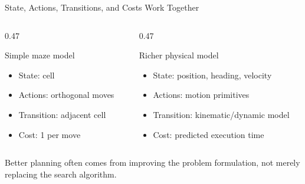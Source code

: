 \documentclass[aspectratio=169,10pt]{beamer}
\begin{document}
\begin{frame}[shrink=20]{State, Actions, Transitions, and Costs Work Together}
  \begin{columns}[T,onlytextwidth]
    \begin{column}{0.47\textwidth}
      \begin{block}{Simple maze model}
        \begin{itemize}
          \item State: cell
          \item Actions: orthogonal moves
          \item Transition: adjacent cell
          \item Cost: 1 per move
        \end{itemize}
      \end{block}
    \end{column}

    \begin{column}{0.47\textwidth}
      \begin{block}{Richer physical model}
        \begin{itemize}
          \item State: position, heading, velocity
          \item Actions: motion primitives
          \item Transition: kinematic/dynamic model
          \item Cost: predicted execution time
        \end{itemize}
      \end{block}
    \end{column}
  \end{columns}

  \begin{keyidea}
    Better planning often comes from improving the problem formulation, not merely replacing the search algorithm.
  \end{keyidea}
\end{frame}
\end{document}

